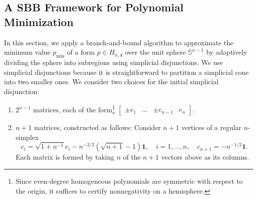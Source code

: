 \documentclass[12pt]{article}
\newcommand{\mbS}{\mathbb{S}}
\theoremstyle{remark}
\begin{document}
\subsection{A SBB Framework for Polynomial Minimization}
\label{sec:adaptive_grid}
In this section, we apply a branch-and-bound algorithm to approximate the minimum value $p_{\min}$ of a form $p\in H_{n,d}$ over the unit sphere $\mbS^{n-1}$ by adaptively dividing the sphere into subregions using simplicial disjunctions.
{We use simplicial disjunctions because it is straightforward to partition a simplicial cone into two smaller ones.
}
We consider two choices for the initial simplicial disjunction:
\begin{enumerate}[label=(\arabic*)]
    \item $2^{n-1}$ matrices, each of the form\footnote{Since even-degree homogeneous polynomials are symmetric with respect to the origin, it suffices to certify nonnegativity on a hemisphere.} $\begin{bmatrix}\pm e_1 & \ldots & \pm e_{n-1} & e_n\end{bmatrix}$.
    \item $n+1$ matrices, constructed as follows: Consider $n+1$ vertices of a regular $n$-simplex
\[c_i=\sqrt{1+n^{-1}}e_i-n^{-3/2}(\sqrt{n+1}-1)\mathbf{1},\quad i=1,\ldots,n,\quad c_{n+1}=-n^{-1/2}\mathbf{1}.\]
Each matrix is formed by taking $n$ of the $n+1$ vectors above as its columns.
\end{enumerate}
\end{document}
